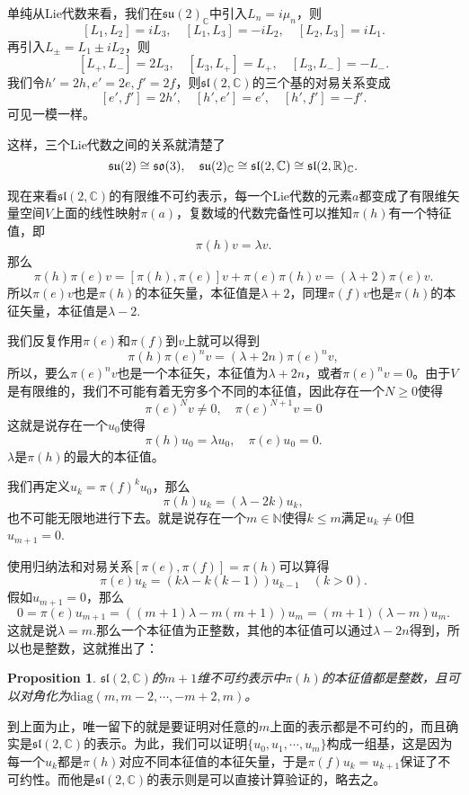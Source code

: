 \documentclass[9pt]{extbook}
\theoremstyle{plain}
\newtheorem{pro}[defi]{Proposition}
\newcommand{\cc}{\mathbb{C}}
\begin{document}
单纯从Lie代数来看，我们在$\mathfrak{su}(2)_\cc$中引入$L_n=i\mu_n$，则
\[
	[L_1,L_2]=iL_3,\quad [L_1,L_3]=-iL_2,\quad [L_2,L_3]=iL_1.
\]
再引入$L_\pm=L_1\pm iL_2$，则
\[
	[L_+,L_-]=2L_3,\quad [L_3,L_+]=L_+,\quad [L_3,L_-]=-L_-.
\]
我们令$h'=2h,e'=2e,f'=2f$，则$\mathfrak{sl}(2,\cc)$的三个基的对易关系变成
\[
[e',f']=2h',\quad[h',e']=e',\quad[h',f']=-f'.
\]
可见一模一样。

这样，三个Lie代数之间的关系就清楚了
\[
	\mathfrak{su}(2)\cong\mathfrak{so}(3),\quad \mathfrak{su}(2)_\cc\cong \mathfrak{sl}(2,\mathbb{C}) \cong\mathfrak{sl}(2,\rr)_\cc.
\]

现在来看$\mathfrak{sl}(2,\mathbb{C})$的有限维不可约表示，每一个Lie代数的元素$a$都变成了有限维矢量空间$V$上面的线性映射$\pi(a)$，复数域的代数完备性可以推知$\pi(h)$有一个特征值，即
\[
	\pi(h)v=\lambda v.
\]
那么
\[
	\pi(h)\pi(e)v=[\pi(h),\pi(e)]v+\pi(e)\pi(h)v=(\lambda+2)\pi(e)v.
\]
所以$\pi(e)v$也是$\pi(h)$的本征矢量，本征值是$\lambda+2$，同理$\pi(f)v$也是$\pi(h)$的本征矢量，本征值是$\lambda-2$.

我们反复作用$\pi(e)$和$\pi(f)$到$v$上就可以得到
\[
	\pi(h)\pi(e)^nv=(\lambda+2n)\pi(e)^nv,
\]
所以，要么$\pi(e)^nv$也是一个本征矢，本征值为$\lambda+2n$，或者$\pi(e)^nv=0$。由于$V$是有限维的，我们不可能有着无穷多个不同的本征值，因此存在一个$N\geq 0$使得
\[
	\pi(e)^Nv\neq 0,\quad \pi(e)^{N+1}v=0
\]
这就是说存在一个$u_0$使得
\[
	\pi(h)u_0=\lambda u_0,\quad \pi(e)u_0=0.
\]
$\lambda$是$\pi(h)$的最大的本征值。

我们再定义$u_k=\pi(f)^ku_0$，那么
\[
	\pi(h)u_k=(\lambda-2k) u_k,
\]
也不可能无限地进行下去。就是说存在一个$m\in \mathbb{N}$使得$k\leq m$满足$u_k\neq 0$但$u_{m+1}=0$.

使用归纳法和对易关系$[\pi(e),\pi(f)]=\pi(h)$可以算得
\[
\pi(e)u_k=(k\lambda -k(k-1)) u_{k-1}\quad (k>0).
\]
假如$u_{m+1}=0$，那么
\[
0=\pi(e)u_{m+1}=((m+1)\lambda -m(m+1)) u_{m}=(m+1)(\lambda-m)u_{m}.
\]
这就是说$\lambda=m$.那么一个本征值为正整数，其他的本征值可以通过$\lambda-2n$得到，所以也是整数，这就推出了：
\begin{pro}
$\mathfrak{sl}(2,\mathbb{C})$的$m+1$维不可约表示中$\pi(h)$的本征值都是整数，且可以对角化为$\mathrm{diag}(m,m-2,\cdots,-m+2,m)$。
\end{pro}
到上面为止，唯一留下的就是要证明对任意的$m$上面的表示都是不可约的，而且确实是$\mathfrak{sl}(2,\mathbb{C})$的表示。为此，我们可以证明$\{u_0,u_1,\cdots,u_m\}$构成一组基，这是因为每一个$u_k$都是$\pi(h)$对应不同本征值的本征矢量，于是$\pi(f)u_k=u_{k+1}$保证了不可约性。而他是$\mathfrak{sl}(2,\mathbb{C})$的表示则是可以直接计算验证的，略去之。
\end{document}
